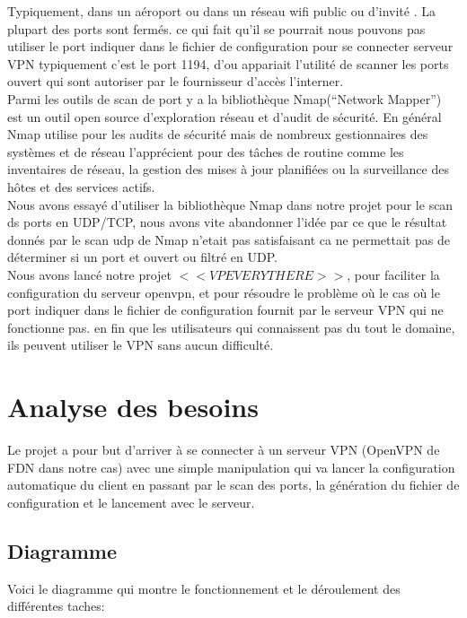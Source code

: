 \documentclass[12pt,a4paper]{article}
\begin{document}
Typiquement, dans un aéroport ou dans un réseau wifi public ou d'invité . La plupart des ports sont fermés. ce qui fait qu'il se pourrait nous pouvons pas utiliser le port indiquer dans le fichier de configuration pour se connecter  serveur VPN typiquement c'est le port 1194, d'ou appariait l'utilité de scanner les ports ouvert qui sont autoriser par le fournisseur d'accès l'interner.\\

Parmi les outils de scan de port y a la bibliothèque Nmap(“Network Mapper”) est un outil open source d'exploration réseau et d'audit de sécurité. En général Nmap utilise pour les audits de sécurité mais de nombreux gestionnaires des systèmes et de réseau l'apprécient pour des tâches de routine comme les inventaires de réseau, la gestion des mises à jour planifiées ou la surveillance des hôtes et des services actifs.\\

Nous avons essayé d'utiliser la bibliothèque Nmap dans notre projet pour le scan ds ports en UDP/TCP, nous avons vite abandonner l'idée par ce que le résultat donnés par le scan udp de Nmap n'etait pas satisfaisant ca ne permettait pas de déterminer si un port et ouvert ou filtré en UDP.\\

Nous avons lancé notre projet \textbf{$<<VPEVERYTHERE>>$}, pour faciliter la configuration du serveur openvpn, et pour résoudre le problème où le cas où le port indiquer dans le fichier de configuration fournit par le serveur VPN qui ne fonctionne pas. en fin que les utilisateurs qui connaissent pas du tout le domaine, ils peuvent utiliser le VPN sans aucun difficulté.
\newpage

\section{Analyse des besoins}

Le projet a pour but d'arriver à se connecter à un serveur VPN (OpenVPN de FDN dans notre cas) avec une simple manipulation qui va lancer la configuration automatique du client en passant par le scan des ports, la génération du fichier de configuration et le lancement avec le serveur.
\subsection{Diagramme}
Voici le diagramme qui montre le fonctionnement et le déroulement des différentes taches:\\
\end{document}
